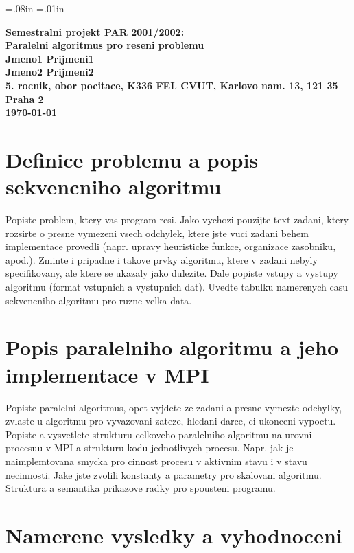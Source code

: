  \oddsidemargin=-5mm
\evensidemargin=-5mm\marginparwidth=.08in \marginparsep=.01in
\marginparpush=5pt\topmargin=-15mm\headheight=12pt
\headsep=25pt\footheight=12pt \footskip=30pt\textheight=25cm
\textwidth=17cm\columnsep=2mm
\columnseprule=1pt\parindent=15pt\parskip=2pt


\begin{center}
\bf Semestralni projekt PAR 2001/2002:\\[5mm]
    Paralelni algoritmus pro reseni problemu\\[5mm] 
       Jmeno1 Prijmeni1\\
       Jmeno2 Prijmeni2\\[2mm]
5. rocnik, obor pocitace, K336 FEL CVUT, Karlovo nam. 13, 121 35 Praha 2\\[2mm]
\today
\end{center}

\section{Definice problemu a popis sekvencniho algoritmu}

Popiste problem, ktery vas program resi. Jako vychozi pouzijte text
zadani, ktery rozsirte o presne vymezeni vsech odchylek, ktere jste
vuci zadani behem implementace provedli 
(napr.  upravy heuristicke funkce, organizace zasobniku,
apod.). Zminte i pripadne i takove prvky algoritmu, ktere v zadani
nebyly specifikovany, ale ktere se ukazaly jako dulezite.  Dale
popiste vstupy a vystupy algoritmu (format vstupnich a vystupnich
dat). Uvedte tabulku namerenych casu sekvencniho algoritmu pro ruzne
velka data.

\section{Popis paralelniho algoritmu a jeho implementace v MPI}

Popiste paralelni algoritmus, opet vyjdete ze zadani a presne vymezte
odchylky, zvlaste u algoritmu pro vyvazovani zateze, hledani darce, ci
ukonceni vypoctu.  Popiste a vysvetlete strukturu celkoveho
paralelniho algoritmu na urovni procesuu v MPI a strukturu kodu
jednotlivych procesu. Napr. jak je naimplemtovana smycka pro cinnost
procesu v aktivnim stavu i v stavu necinnosti. Jake jste zvolili
konstanty a parametry pro skalovani algoritmu. Struktura a semantika
prikazove radky pro spousteni programu.

\section{Namerene vysledky a vyhodnoceni}

